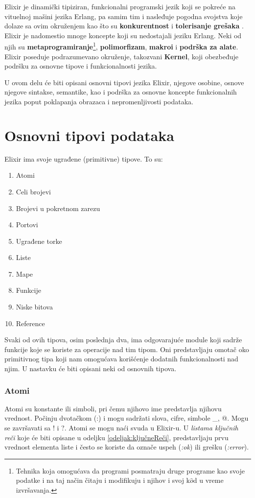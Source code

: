 \documentclass[12pt,oneside]{memoir}
\begin{document}
Elixir je dinamički tipiziran, funkcionalni programski jezik koji se pokreće na vituelnoj mašini jezika Erlang, pa samim tim i nasleđuje pogodna svojstva koje dolaze sa ovim okruženjem kao što su \textbf{konkurentnost} i \textbf{tolerisanje grešaka} \cite{DefinicijaElixira}. Elixir je nadomestio mnoge koncepte koji su nedostajali jeziku Erlang. Neki od njih su  \textbf{metaprogramiranje}\footnote{Tehnika koja omogućava da programi posmatraju druge programe kao svoje podatke i na taj način čitaju i modifikuju i njihov i svoj k$\hat{o}$d u vreme izvršavanja.}, \textbf{polimorfizam}, \textbf{makroi} i \textbf{podrška za alate}. Elixir poseduje podrazumevano okruženje, takozvani \textbf{Kernel}, koji obezbeđuje podršku za osnovne tipove i funkcionalnosti jezika. 

U ovom delu će biti opisani osnovni tipovi jezika Elixir, njegove osobine, osnove njegove sintakse, semantike, kao i podrška za osnovne koncepte funkcionalnih jezika poput poklapanja obrazaca i nepromenljivosti podataka. 

\newpage

\section{Osnovni tipovi podataka}

Elixir ima svoje ugrađene (primitivne) tipove. To su: 
\begin{enumerate}
\itemsep0em 
    \item {Atomi}
    \item {Celi brojevi}
    \item {Brojevi u pokretnom zarezu}
    \item {Portovi}
    \item {Ugrađene torke}
    \item {Liste}
    \item {Mape}
    \item {Funkcije}
    \item {Niske bitova}
    \item {Reference}
\end{enumerate}

Svaki od ovih tipova, osim poslednja dva, ima odgovarajuće module koji sadrže funkcije koje se koriste za operacije nad tim tipom. Oni predstavljaju omotač oko primitivnog tipa koji nam omogućava korišćenje dodatnih funkcionalnosti nad njim. U nastavku će biti opisani neki od osnovnih tipova.

\subsubsection{Atomi}
Atomi su konstante ili simboli, pri čemu njihovo ime predstavlja njihovu vrednost. Počinju dvotačkom (:) i mogu sadržati slova, cifre, simbole \_, @. Mogu se završavati sa ! i ?. Atomi se mogu naći svuda u Elixir-u. U \textit{listama ključnih reči} koje će biti opisane u odeljku \ref{odeljak:ključneReči}, predstavljaju prvu vrednost elementa liste i često se koriste da označe uspeh (\textit{:ok}) ili grešku (\textit{:error}).
\end{document}
